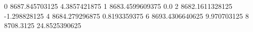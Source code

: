 0 8687.845703125 4.3857421875
1 8683.4599609375 0.0
2 8682.1611328125 -1.298828125
4 8684.279296875 0.8193359375
6 8693.4306640625 9.970703125
8 8708.3125 24.8525390625
